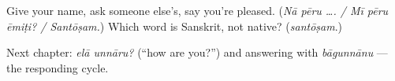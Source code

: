 \begin{tcolorbox}[breakable,colback=teal!4,colframe=teal!35!black,title={Before you move on}]
Give your name, ask someone else's, say you're pleased. (\emph{Nā pēru …. / Mī pēru ēmiṭi? / Santōṣam.}) Which word is Sanskrit, not native? (\emph{santōṣam}.)

Next chapter: \emph{elā unnāru?} (\textquotedblleft{}how are you?\textquotedblright{}) and answering with \emph{bāgunnānu} — the responding cycle.
\end{tcolorbox}
